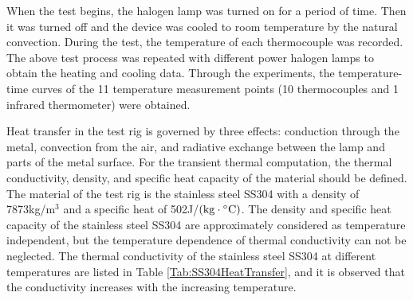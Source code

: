 When the test begins, the halogen lamp was turned on for a period of time. Then it was turned off and the device was cooled to room temperature by the natural convection.
During the test, the temperature of each thermocouple was recorded.
The above test process was repeated with different power halogen lamps to obtain the heating and cooling data.
Through the experiments, the temperature-time curves of the 11 temperature measurement points (10 thermocouples and 1 infrared thermometer) were obtained.


Heat transfer in the test rig is governed by three effects: conduction through the metal, convection from the air, and radiative exchange between the lamp and parts of the metal surface. 
For the transient thermal computation, the thermal conductivity, density, and specific heat capacity of the material should be defined.
The material of the test rig is the stainless steel SS304 with a density of 7873kg/m$^3$ and a specific heat of 502J/$({\rm{kg}} \cdot {}^ \circ {\rm{C}})$. The density and specific heat capacity of the stainless steel SS304 are approximately considered as temperature independent, but the temperature dependence of thermal conductivity can not be neglected. The thermal conductivity of the stainless steel SS304 at different temperatures are listed in Table \ref{Tab:SS304HeatTransfer}, and it is observed that the conductivity increases with the increasing temperature. 

